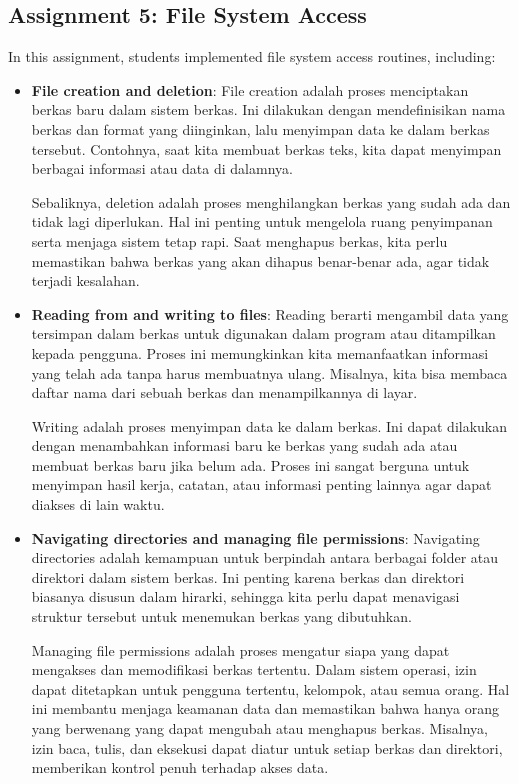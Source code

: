 \documentclass[12pt]{article}
\begin{document}
\subsection{Assignment 5: File System Access}
In this assignment, students implemented file system access routines, including:
\begin{itemize}
   \item \textbf{File creation and deletion}: File creation adalah proses menciptakan berkas baru dalam sistem berkas. Ini dilakukan dengan mendefinisikan nama berkas dan format yang diinginkan, lalu menyimpan data ke dalam berkas tersebut. Contohnya, saat kita membuat berkas teks, kita dapat menyimpan berbagai informasi atau data di dalamnya.
    
    Sebaliknya, deletion adalah proses menghilangkan berkas yang sudah ada dan tidak lagi diperlukan. Hal ini penting untuk mengelola ruang penyimpanan serta menjaga sistem tetap rapi. Saat menghapus berkas, kita perlu memastikan bahwa berkas yang akan dihapus benar-benar ada, agar tidak terjadi kesalahan.
    
    \item \textbf{Reading from and writing to files}: Reading berarti mengambil data yang tersimpan dalam berkas untuk digunakan dalam program atau ditampilkan kepada pengguna. Proses ini memungkinkan kita memanfaatkan informasi yang telah ada tanpa harus membuatnya ulang. Misalnya, kita bisa membaca daftar nama dari sebuah berkas dan menampilkannya di layar.
    
    Writing adalah proses menyimpan data ke dalam berkas. Ini dapat dilakukan dengan menambahkan informasi baru ke berkas yang sudah ada atau membuat berkas baru jika belum ada. Proses ini sangat berguna untuk menyimpan hasil kerja, catatan, atau informasi penting lainnya agar dapat diakses di lain waktu.
    
    \item \textbf{Navigating directories and managing file permissions}: Navigating directories adalah kemampuan untuk berpindah antara berbagai folder atau direktori dalam sistem berkas. Ini penting karena berkas dan direktori biasanya disusun dalam hirarki, sehingga kita perlu dapat menavigasi struktur tersebut untuk menemukan berkas yang dibutuhkan.
    
    Managing file permissions adalah proses mengatur siapa yang dapat mengakses dan memodifikasi berkas tertentu. Dalam sistem operasi, izin dapat ditetapkan untuk pengguna tertentu, kelompok, atau semua orang. Hal ini membantu menjaga keamanan data dan memastikan bahwa hanya orang yang berwenang yang dapat mengubah atau menghapus berkas. Misalnya, izin baca, tulis, dan eksekusi dapat diatur untuk setiap berkas dan direktori, memberikan kontrol penuh terhadap akses data.


\end{itemize}
\end{document}
